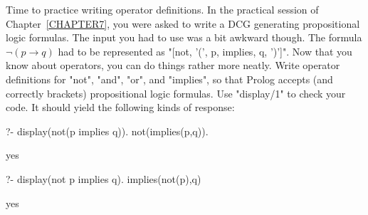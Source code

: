 Time to  practice writing operator definitions.
In the practical session of Chapter~\ref{CHAPTER7}, you were asked to
write a DCG generating propositional logic formulas. The input you had
to use was a bit awkward though. The formula $\neg (p \rightarrow q)$
had to be represented as "[not, '(', p, implies, q, ')']". Now that
you know about operators, you can do things rather more neatly. Write
operator definitions for  "not", "and", "or", and
"implies", so that Prolog accepts (and correctly brackets)
propositional logic formulas. Use "display/1" to check
your code.
It should yield the  following kinds of response:
\begin{LPNcodedisplay}
?- display(not(p implies q)).
not(implies(p,q)).

yes

?- display(not p implies q).
implies(not(p),q)

yes
\end{LPNcodedisplay}
